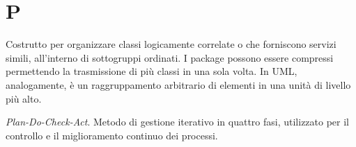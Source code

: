 
\section{P}

Costrutto per organizzare classi logicamente correlate o che forniscono servizi simili, all'interno di sottogruppi ordinati. I package possono essere compressi permettendo la trasmissione di più classi in una sola volta. In UML, analogamente, è un raggruppamento arbitrario di elementi in una unità di livello più alto.

\textit{Plan-Do-Check-Act}. Metodo di gestione iterativo in quattro fasi, utilizzato per il controllo e il miglioramento continuo dei processi.
